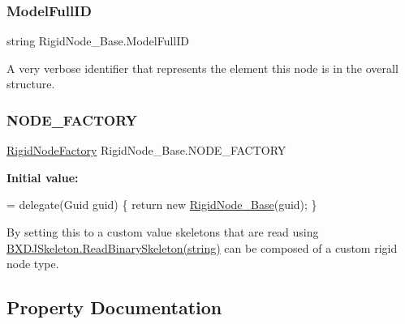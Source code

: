 \subsubsection{\texorpdfstring{Model\+Full\+ID}{ModelFullID}}
{\footnotesize\ttfamily string Rigid\+Node\+\_\+\+Base.\+Model\+Full\+ID}



A very verbose identifier that represents the element this node is in the overall structure. 

\mbox{\label{class_rigid_node___base_a3852bedd7b03e4ca9023dbc82bfc911c}} 
\subsubsection{\texorpdfstring{N\+O\+D\+E\+\_\+\+F\+A\+C\+T\+O\+RY}{NODE\_FACTORY}}
{\footnotesize\ttfamily \hyperlink{class_rigid_node___base_ae13cbb7e730cd0e19c77efa84edbceca}{Rigid\+Node\+Factory} Rigid\+Node\+\_\+\+Base.\+N\+O\+D\+E\+\_\+\+F\+A\+C\+T\+O\+RY\hspace{0.3cm}{\ttfamily [static]}}

{\bfseries Initial value\+:}
\begin{DoxyCode}
= delegate(Guid guid)
    \{
        \textcolor{keywordflow}{return} \textcolor{keyword}{new} \hyperlink{class_rigid_node___base_ad717bbf1b9a1b28d24dbdf7242cf4a1b}{RigidNode\_Base}(guid);
    \}
\end{DoxyCode}


By setting this to a custom value skeletons that are read using \hyperlink{class_b_x_d_j_skeleton_aeacead12f7e921a9c77a588773901798}{B\+X\+D\+J\+Skeleton.\+Read\+Binary\+Skeleton(string)} can be composed of a custom rigid node type. 



\subsection{Property Documentation}
\mbox{\label{class_rigid_node___base_aa4562673f4d55888f3dfa594b62bf7d1}} 

